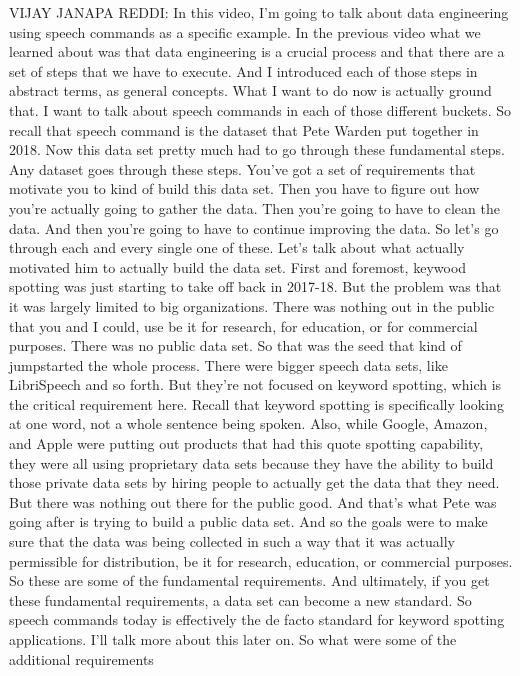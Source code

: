 VIJAY JANAPA REDDI: In this video, I'm going
to talk about data engineering using speech commands as a specific example.
In the previous video what we learned about
was that data engineering is a crucial process
and that there are a set of steps that we have to execute.
And I introduced each of those steps in abstract terms, as general concepts.
What I want to do now is actually ground that.
I want to talk about speech commands in each of those different buckets.
So recall that speech command is the dataset
that Pete Warden put together in 2018.
Now this data set pretty much had to go through these fundamental steps.
Any dataset goes through these steps.
You've got a set of requirements that motivate
you to kind of build this data set.
Then you have to figure out how you're actually going to gather the data.
Then you're going to have to clean the data.
And then you're going to have to continue improving the data.
So let's go through each and every single one of these.
Let's talk about what actually motivated him to actually build the data set.
First and foremost, keywood spotting was just
starting to take off back in 2017-18.
But the problem was that it was largely limited to big organizations.
There was nothing out in the public that you and I could, use
be it for research, for education, or for commercial purposes.
There was no public data set.
So that was the seed that kind of jumpstarted the whole process.
There were bigger speech data sets, like LibriSpeech and so forth.
But they're not focused on keyword spotting,
which is the critical requirement here.
Recall that keyword spotting is specifically
looking at one word, not a whole sentence being spoken.
Also, while Google, Amazon, and Apple were putting out
products that had this quote spotting capability,
they were all using proprietary data sets
because they have the ability to build those private data
sets by hiring people to actually get the data that they need.
But there was nothing out there for the public good.
And that's what Pete was going after is trying to build a public data set.
And so the goals were to make sure that the data was being collected
in such a way that it was actually permissible for distribution,
be it for research, education, or commercial purposes.
So these are some of the fundamental requirements.
And ultimately, if you get these fundamental requirements,
a data set can become a new standard.
So speech commands today is effectively the de facto standard
for keyword spotting applications.
I'll talk more about this later on.
So what were some of the additional requirements

